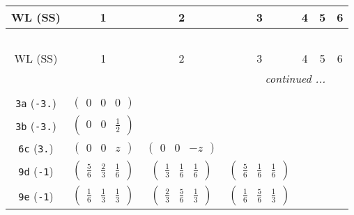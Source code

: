 \documentclass[fleqn,9pt,landscape]{jsarticle}
\begin{document}
\begin{center}
\renewcommand{\arraystretch}{1.2}
\begin{longtable}{ccccccc}
 \hline \hline
WL (SS) & 1 & 2 & 3 & 4 & 5 & 6 \\ \hline \endfirsthead

\multicolumn{6}{l}{\tablename\ \thetable{}} \\
 \hline \hline
WL (SS) & 1 & 2 & 3 & 4 & 5 & 6 \\ \hline \endhead

 \hline \hline
\multicolumn{6}{r}{\footnotesize\it continued ...} \\ \endfoot

 \hline \hline
\multicolumn{6}{r}{} \\ \endlastfoot

{\tt 3a} ({\tt -3.}) & $ \begin{pmatrix} 0 & 0 & 0 \end{pmatrix} $ & $  $ & $  $ & $  $ & $  $ & $  $ \\ \hline
{\tt 3b} ({\tt -3.}) & $ \begin{pmatrix} 0 & 0 & \frac{1}{2} \end{pmatrix} $ & $  $ & $  $ & $  $ & $  $ & $  $ \\ \hline
{\tt 6c} ({\tt 3.}) & $ \begin{pmatrix} 0 & 0 & z \end{pmatrix} $ & $ \begin{pmatrix} 0 & 0 & - z \end{pmatrix} $ & $  $ & $  $ & $  $ & $  $ \\ \hline
{\tt 9d} ({\tt -1}) & $ \begin{pmatrix} \frac{5}{6} & \frac{2}{3} & \frac{1}{6} \end{pmatrix} $ & $ \begin{pmatrix} \frac{1}{3} & \frac{1}{6} & \frac{1}{6} \end{pmatrix} $ & $ \begin{pmatrix} \frac{5}{6} & \frac{1}{6} & \frac{1}{6} \end{pmatrix} $ & $  $ & $  $ & $  $ \\ \hline
{\tt 9e} ({\tt -1}) & $ \begin{pmatrix} \frac{1}{6} & \frac{1}{3} & \frac{1}{3} \end{pmatrix} $ & $ \begin{pmatrix} \frac{2}{3} & \frac{5}{6} & \frac{1}{3} \end{pmatrix} $ & $ \begin{pmatrix} \frac{1}{6} & \frac{5}{6} & \frac{1}{3} \end{pmatrix} $ & $  $ & $  $ & $  $ \\ \hline

\end{longtable}
\end{center}
\end{document}
